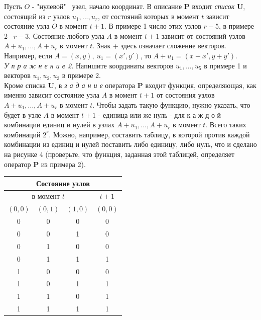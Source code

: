 \documentclass[a4paper]{article}
\begin{document}
	\begin{multicols}{2}
		Пусть $O$ - "нулевой" \ узел, начало координат. В описание $\textbf{P}$ входит \textit{список} $\textbf{U}$, состоящий из $r$ узлов $u_1, ... , u_r$, от состояний которых в момент $t$ зависит состояние узла $O$ в момент $t+1$. В примере 1 число этих узлов $r-5$, в примере 2 \ $r - 3$. Состояние любого узла $A$ в момент $t+1$ зависит от состояний узлов $A + u_1, ... , A + u_r$ в момент $t$. Знак + здесь означает сложение векторов. Например, если $A = (x, y), \ u_1 = (x', y')$, то $A + u_1 = (x + x', y + y')$.\\[10pt]
		\small{\textit{У п р а ж н е н и е 2.} Напишите координаты векторов $u_1, ... , u_5$ в примере 1 и векторов $u_1, u_2, u_3$ в примере 2.}\\[10pt]
		Кроме списка \textbf{U}, в \textit{з а д а н и е} оператора \textbf{P} входит функция, определяющая, как именно зависит состояние узла $A$ в момент $t + 1$ от состояния узлов $A + u_1, ... , A + u_r$ в момент $t$. Чтобы задать такую функцию, нужно указать, что будет в узле $A$ в момент $t + 1$ - единица или же нуль - для к а ж д о й  комбинации единиц и нулей в узлах $A + u_1, ... , A + u_r$ в момент $t$. Всего таких комбинаций $2^r$. Можно, например, составить таблицу, в которой против каждой комбинации из единиц и нулей поставить либо единицу, либо нуль, что и сделано на рисунке 4 (проверьте, что функция, заданная этой таблицей, определяет оператор \textbf{P} из примера 2).\\ 
		\begin{minipage}{\linewidth}
			\centering
			\begin{tabular}{|c|c|c|c|}
				\hline
				\multicolumn{4}{|c|}{Состояние узлов}\\
				\hline
				\multicolumn{3}{|c|}{в момент $t$} & $t + 1$\\ 
				\hline
				$(0,0)$ & $(0,1)$ & $(1,0)$ & $(0,0)$ \\
				\hline
				0 & 0 & 0 & 0 \\
				\hline
				0 & 0 & 1 & 0 \\
				\hline
				0 & 1 & 0 & 0 \\
				\hline
				0 & 1 & 1 & 1 \\
				\hline
				1 & 0 & 0 & 0 \\
				\hline
				1 & 0 & 1 & 1 \\
				\hline
				1 & 1 & 0 & 1 \\
				\hline
				1 & 1 & 1 & 1 \\
				\hline
			\end{tabular}

\end{minipage}
\end{multicols}
\end{document}
